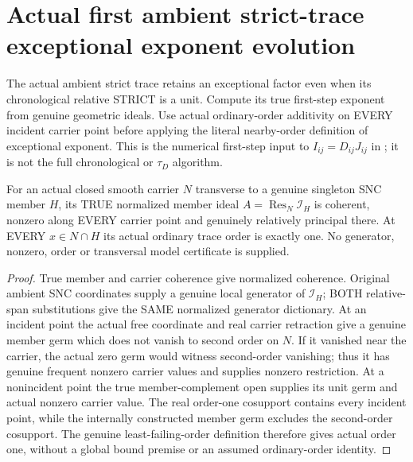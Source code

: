 \section{Actual first ambient strict-trace exceptional exponent evolution}

The actual ambient strict trace retains an exceptional factor even when
its chronological relative STRICT is a unit. Compute its true first-step
exponent from genuine geometric ideals. Use actual ordinary-order
additivity on EVERY incident carrier point before applying the literal
nearby-order definition of exceptional exponent. This is the numerical
first-step input to $I_{ij}=D_{ij}J_{ij}$ in
\cite[pp.~293--295]{bierstone-milman97-invent-math}; it is not the
full chronological or $\tau_D$ algorithm.

\begin{lemma}
\label{hir:sharp-actual-normalized-transverse-member-geometry-order-one}
\leanok
For an actual closed smooth carrier $N$ transverse to a genuine singleton
SNC member $H$, its TRUE normalized member ideal
$A=\operatorname{Res}_N\mathcal I_H$ is coherent, nonzero along EVERY
carrier point and genuinely relatively principal there. At EVERY
$x\in N\cap H$ its actual ordinary trace order is exactly one. No
generator, nonzero, order or transversal model certificate is supplied.
\end{lemma}
\begin{proof}
True member and carrier coherence give normalized coherence. Original
ambient SNC coordinates supply a genuine local generator of
$\mathcal I_H$; BOTH relative-span substitutions give the SAME
normalized generator dictionary. At an incident point the actual free
coordinate and real carrier retraction give a genuine member germ which
does not vanish to second order on $N$. If it vanished near the carrier,
the actual zero germ would witness second-order vanishing; thus it has
genuine frequent nonzero carrier values and supplies nonzero restriction.
At a nonincident point the true member-complement open supplies its unit
germ and actual nonzero carrier value. The real order-one cosupport
contains every incident point, while the internally constructed member
germ excludes the second-order cosupport. The genuine least-failing-order
definition therefore gives actual order one, without a global bound
premise or an assumed ordinary-order identity.
\end{proof}

